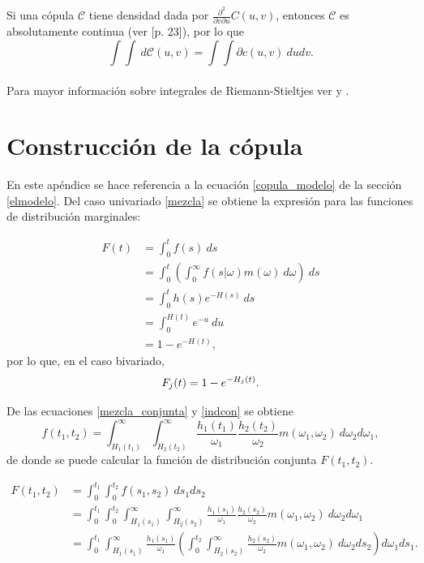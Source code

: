\documentclass[11pt,a4paper]{article}
\newcommand{\C}{\mathcal{C}}
\begin{document}
\begin{appendices}
Si una cópula $\C$ tiene densidad dada por $\frac{\partial ^2}{\partial v \partial u} C(u, v)$, entonces $\C$ es absolutamente continua (ver \citet{nelsen}[p. 23]), por lo que $$\int\int \ d\C(u,v) = \int\int \partial c(u, v) \ dudv.$$\\

Para mayor información sobre integrales de Riemann-Stieltjes ver \citet{rudin} y \citet{bartle}.

\newpage

\section{Construcción de la cópula} \label{construccion_copula}

En este apéndice se hace referencia a la ecuación \eqref{copula_modelo} de la sección \ref{elmodelo}. Del caso univariado \eqref{mezcla} se obtiene la expresión para las funciones de distribución marginales:

\begin{align*}
F(t) &= \int_0^t f(s) \ ds\\
&= \int_0^t\left(\int_0^\infty f(s|\omega)m(\omega) \ d\omega \right) \ ds\\
&= \int_0^t h(s)e^{-H(s)} \ ds\\
&= \int_0^{H(t)} e^{-u} \ du\\
&= 1-e^{-H(t)},
\end{align*}
por lo que, en el caso bivariado,
\begin{equation}\label{dist_marginal}
F_j(t) = 1-e^{-H_j(t)}.\\
\end{equation}

De las ecuaciones \eqref{mezcla_conjunta} y \eqref{indcon} se obtiene $$f(t_1, t_2) = \int_{H_1(t_1)}^\infty \int_{H_2(t_2)}^\infty \frac{h_1(t_1)}{\omega_1}\frac{h_2(t_2)}{\omega_2}m(\omega_1, \omega_2) \ d\omega_2 d\omega_1,$$ de donde se puede calcular la función de distribución conjunta $F(t_1, t_2)$.

\begin{align*}
F(t_1, t_2) &= \int_0^{t_1} \int_0^{t_2} f(s_1, s_2) \ ds_1 ds_2\\
&= \int_0^{t_1} \int_0^{t_2}\int_{H_1(s_1)}^\infty \int_{H_2(s_2)}^\infty \frac{h_1(s_1)}{\omega_1}\frac{h_2(s_2)}{\omega_2}m(\omega_1, \omega_2) \ d\omega_2 d\omega_1\\
&= \int_0^{t_1}\int_{H_1(s_1)}^\infty \frac{h_1(s_1)}{\omega_1}\left(\int_0^{t_2} \int_{H_2(s_2)}^\infty \frac{h_2(s_2)}{\omega_2} m(\omega_1, \omega_2) \ d\omega_2 ds_2 \right) d\omega_1 ds_1.
\end{align*}


\end{appendices}
\end{document}
